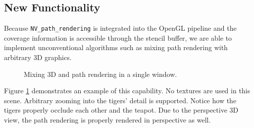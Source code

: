 
\subsection{New Functionality}
\label{sec:newfunc}

Because {\tt NV\_path\_rendering} is integrated into the OpenGL pipeline
and the coverage information is accessible through the stencil buffer,
we are able to implement unconventional algorithms such as mixing path
rendering with arbitrary 3D graphics.

\begin{figure}[bt]
  \caption{\label{fig:tiger3d} Mixing 3D and path rendering in a single
  window.}
\end{figure}

Figure \ref{fig:tiger3d} demonstrates an example of this capability.
No textures are used in this scene.  Arbitrary zooming into the tigers'
detail is supported.  Notice how the tigers properly occlude each other
and the teapot.  Due to the perspective 3D view, the path rendering is
properly rendered in perspective as well.
 
